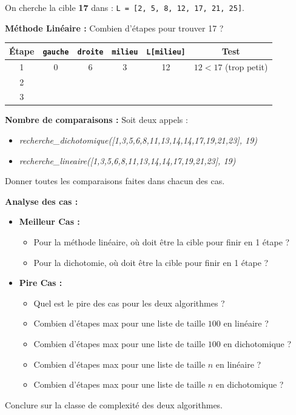 \documentclass[12pt,a4paper]{report}
\begin{document}
\begin{Exercise}[title={Simulation de terrain}]
    On cherche la cible \textbf{17} dans : \texttt{L = [2, 5, 8, 12, 17, 21, 25]}.

    \Question \textbf{Méthode Linéaire :} Combien d'étapes pour trouver 17 ? \dotfill
    
    \begin{center}
    \begin{tabular}{|c|c|c|c|c|c|}
    \hline
    Étape & \texttt{gauche} & \texttt{droite} & \texttt{milieu} & \texttt{L[milieu]} & Test \\ \hline
    1 & 0 & 6 & 3 & 12 & $12 < 17$ (trop petit) \\ \hline
    2 & & & & & \\ \hline
    3 & & & & & \\ \hline
    \end{tabular}
    \end{center}

    \Question \textbf{Nombre de comparaisons :} Soit deux appels :
    \begin{itemize}
        \item \textit{recherche\_dichotomique([1,3,5,6,8,11,13,14,14,17,19,21,23], 19)}
        \item \textit{recherche\_lineaire([1,3,5,6,8,11,13,14,14,17,19,21,23], 19)}
    \end{itemize}
    Donner toutes les comparaisons faites dans chacun des cas.
    
    \Question \textbf{Analyse des cas :}
    \begin{itemize}
        \item \textbf{Meilleur Cas :}
        \begin{itemize}
            \item Pour la méthode linéaire, où doit être la cible pour finir en 1 étape ? \dotfill
            \item Pour la dichotomie, où doit être la cible pour finir en 1 étape ? \dotfill
        \end{itemize}
        \item \textbf{Pire Cas :}
        \begin{itemize}
            \item Quel est le pire des cas pour les deux algorithmes ? \dotfill
            \item Combien d'étapes max pour une liste de taille $100$ en linéaire ? \dotfill
            \item Combien d'étapes max pour une liste de taille $100$ en dichotomique ? \dotfill
            \item Combien d'étapes max pour une liste de taille $n$ en linéaire ? \dotfill
            \item Combien d'étapes max pour une liste de taille $n$ en dichotomique ? \dotfill
        \end{itemize}
    \end{itemize}
    Conclure sur la classe de complexité des deux algorithmes.
\end{Exercise}
\end{document}
